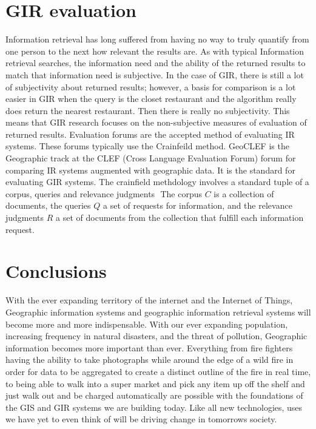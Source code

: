 \documentclass[10pt, conference, compsocconf]{IEEEtran}
\begin{document}
\section{GIR evaluation}
Information retrieval has long suffered from having no way to truly quantify from one person to the next how relevant the results are. As with typical Information retrieval searches, the information need and the ability of the returned results to match that information need is subjective. In the case of GIR, there is still a lot of subjectivity about returned results; however, a basis for comparison is a lot easier in GIR when the query is the closet restaurant and the algorithm really does return the nearest restaurant. Then there is really no subjectivity. This means that GIR research focuses on the non-subjective measures of evaluation of returned results. Evaluation forums are the accepted method of evaluating IR systems. These forums typically use the Crainfeild method. GeoCLEF is the Geographic track at the CLEF (Cross Language Evaluation Forum) forum for comparing IR systems augmented with geographic data. It is the standard for evaluating GIR systems. The crainfield methdology involves a standard tuple of a corpus, queries and relevance judgments \(<C, Q, R>\) The corpus \(C\) is a collection of documents, the queries \(Q\) a set of requests for information, and the relevance judgments \(R\) a set of documents from the collection that fulfill each information request. 
\section{Conclusions}
With the ever expanding territory of the internet and the Internet of Things, Geographic information systems and geographic information retrieval systems will become more and more indispensable. With our ever expanding population, increasing frequency in natural disasters, and the threat of pollution, Geographic information becomes more important than ever. Everything from fire fighters having the ability to take photographs while around the edge of a wild fire in order for data to be aggregated to create a distinct outline of the fire in real time, to being able to walk into a super market and pick any item up off the shelf and just walk out and be charged automatically are possible with the foundations of the GIS and GIR systems we are building today. Like all new technologies, uses we have yet to even think of will be driving change in tomorrows society. 






\end{document}

